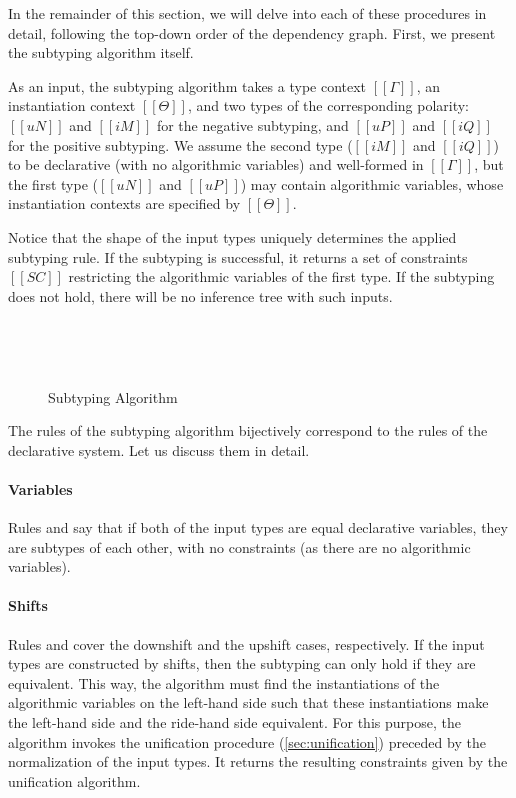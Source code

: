 In the remainder of this section, we will delve into each of these procedures in
detail, following the top-down order of the dependency graph. First, 
we present the subtyping algorithm itself.

As an input, the subtyping algorithm takes
a type context $[[Γ]]$, an instantiation context $[[Θ]]$,
and two types of the corresponding polarity:
$[[uN]]$ and  $[[iM]]$ for the negative subtyping, and
$[[uP]]$ and  $[[iQ]]$ for the positive subtyping.
We assume the second type ($[[iM]]$ and $[[iQ]]$) to be 
declarative (with no algorithmic variables) and well-formed in $[[Γ]]$,
but the first type ($[[uN]]$ and $[[uP]]$) may contain algorithmic variables,
whose instantiation contexts are specified by $[[Θ]]$.

Notice that the shape of the input types uniquely determines the
applied subtyping rule.  If the subtyping is successful, it returns
a set of constraints $[[SC]]$ restricting the algorithmic 
variables of the first type. If the subtyping does not hold, 
there will be no inference tree with such inputs. 

\begin{figure}[h]
  \hfill\\
  \begin{multicols}{2}
    \ottdefnANsubLabeled{}
    \columnbreak\\
    \ottdefnAPsupLabeled{}
  \end{multicols}
  \caption{Subtyping Algorithm}
  \label{fig:alg-subtyping}
\end{figure}

The rules of the subtyping algorithm bijectively correspond to the rules of the declarative
system. Let us discuss them in detail.

\paragraph{Variables} Rules  and 
say that if both of the input types are equal declarative variables,
they are subtypes of each other, with no constraints (as there are no algorithmic variables).

\paragraph{Shifts} Rules  and
 cover the downshift and the upshift cases,
respectively. If the input types are constructed by shifts, then the subtyping
can only hold if they are equivalent. This way, the algorithm must find the
instantiations of the algorithmic variables on the left-hand side
such that these instantiations make the left-hand side and the ride-hand side
equivalent. For this purpose, the algorithm invokes the
unification procedure (\cref{sec:unification}) preceded by the normalization of the input types.
It returns the resulting constraints given by the unification algorithm. 


